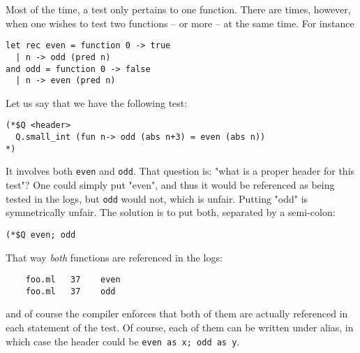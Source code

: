 
Most of the time, a test only pertains to one function. There are times, however, when one
wishes to test two functions -- or more -- at the same time. For instance

\begin{verbatim}
let rec even = function 0 -> true
  | n -> odd (pred n)
and odd = function 0 -> false
  | n -> even (pred n)
\end{verbatim}

Let us say that we have the following test:

\begin{verbatim}
(*$Q <header>
  Q.small_int (fun n-> odd (abs n+3) = even (abs n))
*)
\end{verbatim}

It involves both \texttt{even} and \texttt{odd}. That question is: "what is a proper header for this
test"? One could simply put "even", and thus it would be referenced as being tested in the
logs, but \texttt{odd} would not, which is unfair. Putting "odd" is symmetrically unfair. The
solution is to put both, separated by a semi-colon:

\begin{verbatim}
(*$Q even; odd
\end{verbatim}

That way \emph{both} functions are referenced in the logs:

\begin{verbatim}
    foo.ml   37    even
    foo.ml   37    odd
\end{verbatim}

and of course the compiler enforces that both of them are actually referenced in each
statement of the test. Of course, each of them can be written under alias, in which case
the header could be \texttt{even as x; odd as y}.

